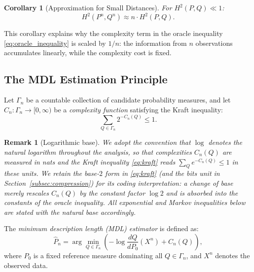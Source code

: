 \documentclass[preprint,review,12pt]{article}
\newtheorem{corollary}[theorem]{Corollary}
\newtheorem{remark}[theorem]{Remark}
\begin{document}
\begin{corollary}[Approximation for Small Distances]\label{cor:small_distance}
For $H^2(P, Q) \ll 1$:
\begin{equation}\label{eq:small_approximation}
	H^2(P^n, Q^n) \approx n \cdot H^2(P, Q).
\end{equation}
\end{corollary}

This corollary explains why the complexity term in the oracle inequality 
\eqref{eq:oracle_inequality} is scaled by $1/n$: the information from $n$ 
observations accumulates linearly, while the complexity cost is fixed.

\subsection{The MDL Estimation Principle}

Let $\Gamma_n$ be a countable collection of candidate probability measures, 
and let $C_n: \Gamma_n \to [0, \infty)$ be a \emph{complexity function} 
satisfying the Kraft inequality:
\begin{equation}\label{eq:kraft}
\sum_{Q \in \Gamma_n} 2^{-C_n(Q)} \leq 1.
\end{equation}

\begin{remark}[Logarithmic base]\label{rem:log_base}
We adopt the convention that $\log$ denotes the natural logarithm throughout
the analysis, so that complexities $C_n(Q)$ are measured in nats and the Kraft
inequality \eqref{eq:kraft} reads $\sum_{Q} e^{-C_n(Q)} \leq 1$ in these units.
We retain the base-$2$ form in \eqref{eq:kraft} (and the bits unit in
Section~\ref{subsec:compression}) for its coding interpretation: a change of
base merely rescales $C_n(Q)$ by the constant factor $\log 2$ and is absorbed
into the constants of the oracle inequality. All exponential and Markov
inequalities below are stated with the natural base accordingly.
\end{remark}

The \emph{minimum description length (MDL) estimator} is defined as:
\begin{equation}\label{eq:mdl_estimator}
\hat{P}_n = \arg\min_{Q \in \Gamma_n} \left( -\log \frac{dQ}{dP_0}(X^n) 
+ C_n(Q) \right),
\end{equation}
where $P_0$ is a fixed reference measure dominating all $Q \in \Gamma_n$, 
and $X^n$ denotes the observed data.
\end{document}
